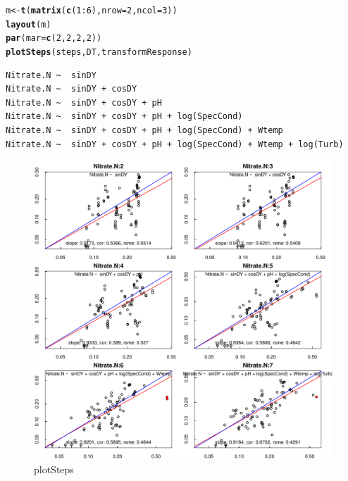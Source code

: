 \documentclass[a4paper,11pt]{article}\usepackage[]{graphicx}\usepackage[]{color}
\makeatletter
\def\maxwidth{ %
  \ifdim\Gin@nat@width>\linewidth
    \linewidth
  \else
    \Gin@nat@width
  \fi
}
\newcommand{\hlnum}[1]{\textcolor[rgb]{0.686,0.059,0.569}{#1}}%
\newcommand{\hlopt}[1]{\textcolor[rgb]{0,0,0}{#1}}%
\newcommand{\hlstd}[1]{\textcolor[rgb]{0.345,0.345,0.345}{#1}}%
\newcommand{\hlkwb}[1]{\textcolor[rgb]{0.69,0.353,0.396}{#1}}%
\newcommand{\hlkwc}[1]{\textcolor[rgb]{0.333,0.667,0.333}{#1}}%
\newcommand{\hlkwd}[1]{\textcolor[rgb]{0.737,0.353,0.396}{\textbf{#1}}}%
\newenvironment{kframe}{%
 \def\at@end@of@kframe{}%
 \ifinner\ifhmode%
  \def\at@end@of@kframe{\end{minipage}}%
  \begin{minipage}{\columnwidth}%
 \fi\fi%
 \def\FrameCommand##1{\hskip\@totalleftmargin \hskip-\fboxsep
 \colorbox{shadecolor}{##1}\hskip-\fboxsep
     \hskip-\linewidth \hskip-\@totalleftmargin \hskip\columnwidth}%
 \MakeFramed {\advance\hsize-\width
   \@totalleftmargin\z@ \linewidth\hsize
   \@setminipage}}%
 {\par\unskip\endMakeFramed%
 \at@end@of@kframe}
\newenvironment{knitrout}{}{} %
\makeatother
\begin{document}
\begin{knitrout}
\color{fgcolor}\begin{kframe}
\begin{alltt}
\hlstd{m} \hlkwb{<-} \hlkwd{t}\hlstd{(}\hlkwd{matrix}\hlstd{(}\hlkwd{c}\hlstd{(}\hlnum{1}\hlopt{:}\hlnum{6}\hlstd{),} \hlkwc{nrow} \hlstd{=} \hlnum{2}\hlstd{,} \hlkwc{ncol} \hlstd{=} \hlnum{3}\hlstd{))}
\hlkwd{layout}\hlstd{(m)}
\hlkwd{par}\hlstd{(}\hlkwc{mar}\hlstd{=}\hlkwd{c}\hlstd{(}\hlnum{2}\hlstd{,}\hlnum{2}\hlstd{,}\hlnum{2}\hlstd{,}\hlnum{2}\hlstd{))}
\hlkwd{plotSteps}\hlstd{(steps,DT,transformResponse)}
\end{alltt}
\begin{verbatim}
Nitrate.N ~  sinDY 
Nitrate.N ~  sinDY + cosDY 
Nitrate.N ~  sinDY + cosDY + pH 
Nitrate.N ~  sinDY + cosDY + pH + log(SpecCond) 
Nitrate.N ~  sinDY + cosDY + pH + log(SpecCond) + Wtemp 
Nitrate.N ~  sinDY + cosDY + pH + log(SpecCond) + Wtemp + log(Turb) 
\end{verbatim}
\end{kframe}\begin{figure}[]

\includegraphics[width=\maxwidth]{figure/plotSteps} \caption[plotSteps]{plotSteps\label{fig:plotSteps}}
\end{figure}


\end{knitrout}
\end{document}
